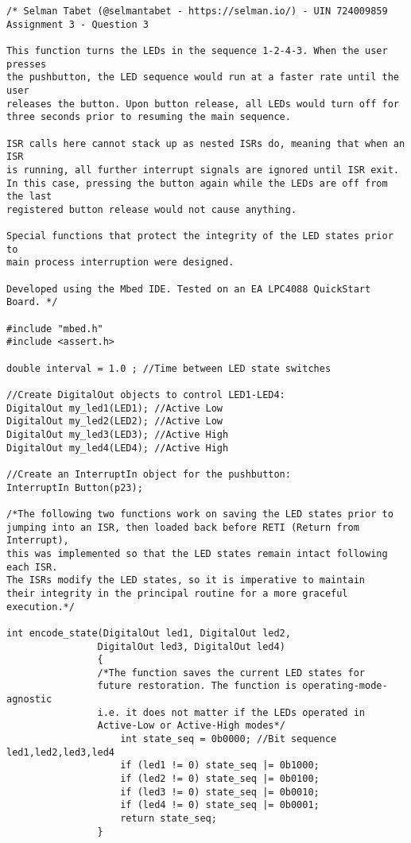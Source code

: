 \documentclass{article}
\begin{document}
\begin{verbatim}
/* Selman Tabet (@selmantabet - https://selman.io/) - UIN 724009859
Assignment 3 - Question 3

This function turns the LEDs in the sequence 1-2-4-3. When the user presses
the pushbutton, the LED sequence would run at a faster rate until the user
releases the button. Upon button release, all LEDs would turn off for
three seconds prior to resuming the main sequence.

ISR calls here cannot stack up as nested ISRs do, meaning that when an ISR
is running, all further interrupt signals are ignored until ISR exit.
In this case, pressing the button again while the LEDs are off from the last
registered button release would not cause anything.

Special functions that protect the integrity of the LED states prior to
main process interruption were designed.

Developed using the Mbed IDE. Tested on an EA LPC4088 QuickStart Board. */

#include "mbed.h"
#include <assert.h>

double interval = 1.0 ; //Time between LED state switches

//Create DigitalOut objects to control LED1-LED4:
DigitalOut my_led1(LED1); //Active Low
DigitalOut my_led2(LED2); //Active Low
DigitalOut my_led3(LED3); //Active High
DigitalOut my_led4(LED4); //Active High

//Create an InterruptIn object for the pushbutton:
InterruptIn Button(p23);

/*The following two functions work on saving the LED states prior to 
jumping into an ISR, then loaded back before RETI (Return from Interrupt),
this was implemented so that the LED states remain intact following each ISR.
The ISRs modify the LED states, so it is imperative to maintain
their integrity in the principal routine for a more graceful execution.*/

int encode_state(DigitalOut led1, DigitalOut led2, 
                DigitalOut led3, DigitalOut led4)
                {
                /*The function saves the current LED states for 
                future restoration. The function is operating-mode-agnostic
                i.e. it does not matter if the LEDs operated in
                Active-Low or Active-High modes*/
                    int state_seq = 0b0000; //Bit sequence led1,led2,led3,led4
                    if (led1 != 0) state_seq |= 0b1000;
                    if (led2 != 0) state_seq |= 0b0100;
                    if (led3 != 0) state_seq |= 0b0010;
                    if (led4 != 0) state_seq |= 0b0001;
                    return state_seq;
                }
                

\end{verbatim}
\end{document}
